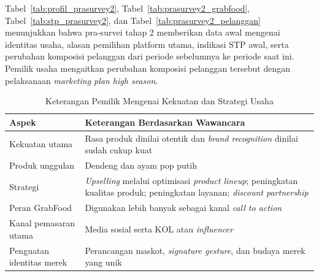 \FloatBarrier
Tabel~\ref{tab:profil_prasurvey2}, Tabel~\ref{tab:prasurvey2_grabfood}, Tabel~\ref{tab:stp_prasurvey2}, dan Tabel~\ref{tab:prasurvey2_pelanggan} menunjukkan bahwa pra-survei tahap 2 memberikan data awal mengenai identitas usaha, alasan pemilihan platform utama, indikasi STP awal, serta perubahan komposisi pelanggan dari periode sebelumnya ke periode saat ini. Pemilik usaha mengaitkan perubahan komposisi pelanggan tersebut dengan pelaksanaan \textit{marketing plan high season}.

\begin{table}[h!]
    \centering
    \caption{Keterangan Pemilik Mengenai Kekuatan dan Strategi Usaha}
    \label{tab:kekuatan_strategi_prasurvey2}
    \begin{tabularx}{\textwidth}{lY}
        \toprule
        \textbf{Aspek}            & \textbf{Keterangan Berdasarkan Wawancara}                                                                                                      \\
        \midrule
        Kekuatan utama            & Rasa produk dinilai otentik dan \textit{brand recognition} dinilai sudah cukup kuat                                                            \\
        Produk unggulan           & Dendeng dan ayam pop putih                                                                                                                     \\
        Strategi                  & \textit{Upselling} melalui optimisasi \textit{product lineup}; peningkatan kualitas produk; peningkatan layanan; \textit{discount partnership} \\
        Peran GrabFood            & Digunakan lebih banyak sebagai kanal \textit{call to action}                                                                                   \\
        Kanal pemasaran utama     & Media sosial serta KOL atau \textit{influencer}                                                                                                \\
        Penguatan identitas merek & Perancangan maskot, \textit{signature gesture}, dan budaya merek yang unik                                                                     \\
        \bottomrule
    \end{tabularx}
\end{table}

